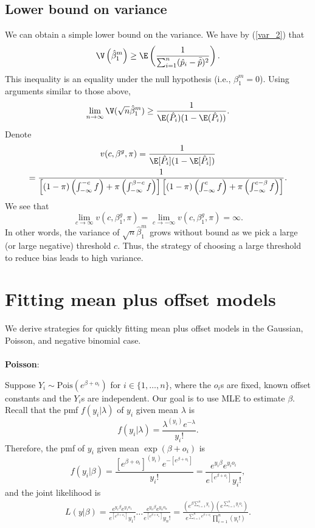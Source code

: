 \documentclass[12pt]{article}
\begin{document}
\subsection{Lower bound on variance}

We can obtain a simple lower bound on the variance. We have by (\ref{var_2}) that
$$\V\left( \hat{\beta}^m_1 \right) \geq \E \left( \frac{1}{ \sum_{i=1}^n ( \hat{p}_i - \bar{\hat{p}})^2 }\right).$$ This inequality is an equality under the null hypothesis (i.e., $\beta^m_1 = 0$). Using arguments similar to those above,
$$\lim_{n \to \infty} \V( \sqrt{n} \hat{\beta}^m_1) \geq \frac{1}{ \E(\hat{P}_i) (1 - \E(\hat{P}_i))}.$$ Denote
\begin{multline*}
v(c,\beta^g,\pi) = \frac{1}{ \E[ \hat{P}_i ] ( 1- \E[\hat{P}_i])} \\ = \frac{1}{\left[ (1-\pi)  \left( \int_{-\infty}^{-c} f \right)+ \pi \left( \int_{-\infty}^{\beta - c} f\right) \right] \left[  (1 - \pi) \left( \int_{-\infty}^c f \right) + \pi \left( \int_{-\infty}^{c- \beta} f\right)\right]}.
\end{multline*}
We see that
$$\lim_{c \to \infty} v(c,\beta^g_1,\pi) = \lim_{c \to -\infty} v(c, \beta^g_1, \pi) = \infty.$$ In other words, the variance of $\sqrt{n}\hat{\beta}^m_1$ grows without bound as we pick a large (or large negative) threshold $c$. Thus, the strategy of choosing a large threshold to reduce bias leads to high variance.

\section{Fitting mean plus offset models}

We derive strategies for quickly fitting mean plus offset models in the Gaussian, Poisson, and negative binomial case.
\\ \\
\textbf{Poisson}:

Suppose $Y_i \sim \textrm{Pois}( e^{ \beta + o_i } )$ for $i \in \{1, \dots, n\}$, where the $o_i$s are fixed, known offset constants and the $Y_i$s are independent. Our goal is to use MLE to estimate $\beta$. Recall that the pmf $f(y_i | \lambda)$ of $y_i$ given mean $\lambda$ is
$$ f(y_i | \lambda) =  \frac{ \lambda^{(y_i)} e^{-\lambda} }{ y_i!}.$$ Therefore, the pmf of $y_i$ given mean $ \exp\left( \beta + o_i \right) $ is 
$$ f(y_i | \beta) = \frac{\left[ e^{\beta + o_i}  \right]^{(y_i)} e ^{ - \left[ e^{\beta + o_i}  \right] }}{ y_i! } = \frac{ e^{y_i\beta} e^{y_i o_i}   }{ e^{\left[ e^{\beta + o_i} \right]} y_i! },$$ and the joint likelihood is
\begin{multline*}
 L( y | \beta ) = \frac{ e^{ y_1 \beta } e^{ y_1 o_1}}{ e^{ \left[ e^{ \beta + o_1 } \right] } y_1! } \dots \frac{ e^{ y_n \beta } e^{ y_n o_n}}{ e^{ \left[ e^{ \beta + o_n } \right] } y_n! }  = \frac{ \left( e^{ \beta \sum_{i=1}^n y_i} \right) \left(e^{ \sum_{i=1}^n y_io_i} \right)}{ e^{ \sum_{i=1}^n e^{\beta + o_i}}  \prod_{i=1}^n \left( y_i! \right) }.
\end{multline*}
\end{document}
